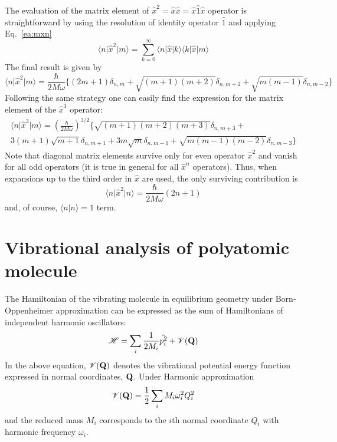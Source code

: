 \documentclass[a4paper,titlepage,twoside,fleqn,12pt]{book}
\begin{document}
\begin{appendices}
The evaluation of the matrix element of $\hat{x}^2=\hat{x}\hat{x}=\hat{x}\hat{1}\hat{x}$ 
operator is straightforward
by using the resolution of identity operator $\hat{1}$ and applying Eq.~\eqref{ea:mxn}
%
\begin{equation}
\langle n \vert \hat{x}^2 \vert m \rangle = 
\sum_{k=0}^{\infty} \langle n \vert \hat{x} \vert k \rangle \langle k \vert \hat{x} \vert m \rangle
\end{equation}
%
The final result is given by
%
\begin{equation} \label{ea:mxxn}
\langle n \vert \hat{x}^2 \vert m \rangle = 
\frac{\hbar}{2M\omega}
\Big\{ 
   (2m+1) \delta_{n,m} + \sqrt{(m+1)(m+2)} \delta_{n,m+2} + %
                         \sqrt{m(m-1)} \delta_{n,m-2}
\Big\}
\end{equation}
%
Following the same strategy one can easily find the expression for 
the matrix element of the $\hat{x}^3$ operator:
%
\begin{multline}
\label{ea:mxxxn}
\langle n \vert \hat{x}^3 \vert m \rangle = 
\left(
\frac{\hbar}{2M\omega}
\right)^{3/2}
\Big\{ 
   \sqrt{(m+1)(m+2)(m+3)} \delta_{n,m+3} + \\
   3(m+1)\sqrt{m+1} \delta_{n,m+1}
      +3m\sqrt{m}   \delta_{n,m-1} + \sqrt{m(m-1)(m-2)} \delta_{n,m-3}
\Big\}
\end{multline}
%
Note that diagonal matrix elements survive only for even operator $\hat{x}^2$
and vanish for all odd operators (it is true in general for all $\hat{x}^n$
operators). Thus, when expansions up to the third order in $\hat{x}$ are 
used, the only surviving contribution is
%
\begin{equation}
\label{ea:mxm}
\langle n \vert \hat{x}^2 \vert n \rangle = 
\frac{\hbar}{2M\omega}(2n+1)
\end{equation}
%
and, of course, $\langle n \vert n \rangle=1$ term.

\section{Vibrational analysis of polyatomic molecule\label{asec:vibranal}}

The Hamiltonian of the vibrating molecule in equilibrium geometry under Born\hyp{}Oppenheimer approximation
can be expressed as the sum of Hamiltonians of independent harmonic oscillators:
\begin{equation}
\mathscr{H} = \sum_i \frac{1}{2M_i}\hat{{p}_i^2} + \mathscr{V}({\bf Q})
\end{equation}
In the above equation, $\mathscr{V}({\bf Q})$ denotes the vibrational potential energy function
expressed in normal coordinates, ${\bf Q}$. Under Harmonic approximation
\begin{equation}
\mathscr{V}({\bf Q}) = \frac{1}{2} \sum_i M_i \omega_i^2 Q_i^2
\end{equation}
and the reduced mass $M_i$ corresponds to the $i$th normal coordinate $Q_i$ with
harmonic frequency $\omega_i$.


\end{appendices}
\end{document}
